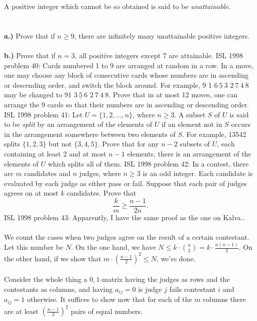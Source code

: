 A positive integer which cannot be so obtained is said to be \textit{unattainable}. \\\\\\
\textbf{a.)}  Prove that if $n\geq 9$, there are infinitely many unattainable positive integers. \\\\
\textbf{b.)}  Prove that if $n=3$, all positive integers except 7 are attainable. 
ISL 1998 problem 40:  Cards numbered 1 to 9 are arranged at random in a row. In a move, one may choose any block of consecutive cards whose numbers are in ascending or descending order, and switch the block around. For example, 9 1 $\underline{6\ 5\ 3}$ $2\ 7\ 4\ 8$ may be changed to $9 1$ $\underline{3\ 5\ 6}$ $2\ 7\ 4\ 8$. Prove that in at most 12 moves, one can arrange the 9 cards so that their numbers are in ascending or descending order. 
ISL 1998 problem 41:  Let $U=\{1,2,\ldots ,n\}$, where $n\geq 3$. A subset $S$ of $U$ is said to be \textit{split} by an arrangement of the elements of $U$ if an element not in $S$ occurs in the arrangement somewhere between two elements of $S$. For example, 13542 splits $\{1,2,3\}$ but not $\{3,4,5\}$. Prove that for any $n-2$ subsets of $U$, each containing at least 2 and at most $n-1$ elements, there is an arrangement of the elements of $U$ which splits all of them. 
ISL 1998 problem 42:  In a contest, there are $m$ candidates and $n$ judges, where $n\geq 3$ is an odd integer. Each candidate is evaluated by each judge as either pass or fail. Suppose that each pair of judges agrees on at most $k$ candidates. Prove that
\[ {\frac{k}{m}} \geq {\frac{n-1}{2n}}. \] 
ISL 1998 problem 43:  Apparently, I have the same proof as the one on Kalva.. \\\\
We count the cases when two judges agree on the result of a certain contestant. Let this number be $N$. On the one hand, we have $N\le k\cdot \binom n2=k\cdot\frac{n(n-1)}2$. On the other hand, if we show that $m\cdot \left(\frac{n-1}2\right)^2\le N$, we're done. \\\\
Consider the whole thing a $0,1$-matrix having the judges as rows and the contestants as columns, and having $a_{ij}=0$ is judge $j$ fails contestant $i$ and $a_{ij}=1$ otherwise. It suffices to show now that for each of the $m$ columns there are at least $\left(\frac{n-1}2\right)^2$ pairs of equal numbers. \\\\
